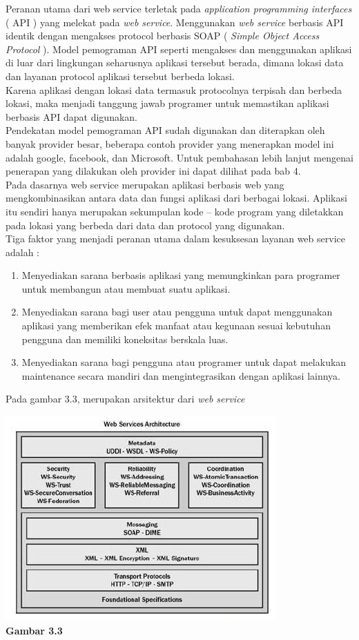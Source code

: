 \tab Peranan utama dari web service terletak pada \textit{application programming interfaces} ( API ) yang melekat pada \textit{web service}. Menggunakan \textit{web service} berbasis API identik dengan mengakses protocol berbasis SOAP ( \textit{Simple Object Access Protocol} ). Model pemograman API seperti mengakses dan menggunakan aplikasi di luar dari lingkungan seharusnya aplikasi tersebut berada, dimana lokasi data dan layanan protocol aplikasi tersebut berbeda lokasi.\\
\tab Karena aplikasi dengan lokasi data termasuk protocolnya terpisah dan berbeda lokasi, maka menjadi tanggung jawab programer untuk memastikan aplikasi berbasis API dapat digunakan.\\
\tab Pendekatan model pemograman API sudah digunakan dan diterapkan oleh banyak provider besar, beberapa contoh provider yang menerapkan model ini adalah google, facebook, dan Microsoft. Untuk pembahasan lebih lanjut mengenai penerapan yang dilakukan oleh provider ini dapat dilihat pada bab 4.\\
\tab Pada dasarnya web service merupakan aplikasi berbasis web yang mengkombinasikan antara data dan fungsi aplikasi dari berbagai lokasi. Aplikasi itu sendiri hanya merupakan sekumpulan kode – kode program yang diletakkan pada lokasi yang berbeda dari data dan protocol yang digunakan.\\
\tab Tiga faktor yang menjadi peranan utama dalam kesuksesan layanan web service adalah :
\begin{enumerate}
\item Menyediakan sarana berbasis aplikasi yang memungkinkan para programer untuk membangun atau membuat suatu aplikasi.
\item Menyediakan sarana bagi user atau pengguna untuk dapat menggunakan aplikasi yang memberikan efek manfaat atau kegunaan sesuai kebutuhan pengguna dan memiliki koneksitas berskala luas.
\item Menyediakan sarana bagi pengguna atau programer untuk dapat melakukan maintenance secara mandiri dan mengintegrasikan dengan aplikasi lainnya.
\end{enumerate}
Pada gambar 3.3, merupakan arsitektur dari \textit{web service}\\
\begin{center}
\includegraphics[scale=1]{Gambar33.jpg}\\
\textbf{Gambar 3.3}
\end{center}
